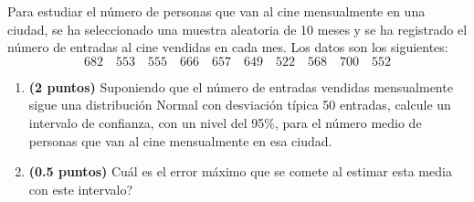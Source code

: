 
Para estudiar el número de personas que van al cine mensualmente en una ciudad, se ha seleccionado una muestra aleatoria de 10 meses y se ha registrado el número de entradas al cine vendidas en cada mes. Los datos son los siguientes:
\[
682\quad553\quad555\quad666\quad657\quad649\quad522\quad568\quad700\quad552
\]
\begin{enumerate}[label=\alph*)]
\item \textbf{(2 puntos)} Suponiendo que el número de entradas vendidas mensualmente sigue una distribución Normal con desviación típica 50 entradas, calcule un intervalo de confianza, con un nivel del 95\%, para el número medio de personas que van al cine mensualmente en esa ciudad.
\item \textbf{(0.5 puntos)} \textquestiondown{}Cuál es el error máximo que se comete al estimar esta media con este intervalo?
\end{enumerate}
